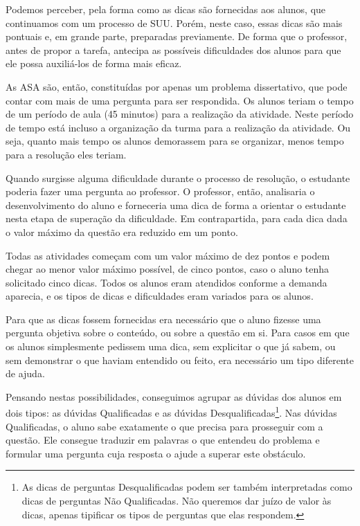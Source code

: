 Podemos perceber, pela forma como as dicas são fornecidas aos alunos, que continuamos com um processo de SUU. Porém, neste caso, essas dicas são mais pontuais e, em grande parte, preparadas previamente. De forma que o professor, antes de propor a tarefa, antecipa as possíveis dificuldades dos alunos para que ele possa auxiliá-los de forma mais eficaz.

As ASA são, então, constituídas por apenas um problema dissertativo, que pode contar com mais de uma pergunta para ser respondida. Os alunos teriam o tempo de um período de aula (45 minutos) para a realização da atividade. Neste período de tempo está incluso a organização da turma para a realização da atividade. Ou seja, quanto mais tempo os alunos demorassem para se organizar, menos tempo para a resolução eles teriam. 

Quando surgisse alguma dificuldade durante o processo de resolução, o estudante poderia fazer uma pergunta ao professor. O professor, então, analisaria o desenvolvimento do aluno e forneceria uma dica de forma a orientar o estudante nesta etapa de superação da dificuldade. Em contrapartida, para cada dica dada o valor máximo da questão era reduzido em um ponto. 

Todas as atividades começam com um valor máximo de dez pontos e podem chegar ao menor valor máximo possível, de cinco pontos, caso o aluno tenha solicitado cinco dicas. Todos os alunos eram atendidos conforme a demanda aparecia, e os tipos de dicas e dificuldades eram variados para os alunos. 

Para que as dicas fossem fornecidas era necessário que o aluno fizesse uma pergunta objetiva sobre o conteúdo, ou sobre a questão em si. Para casos em que os alunos simplesmente pedissem uma dica, sem explicitar o que já sabem, ou sem demonstrar o que haviam entendido ou feito, era necessário um tipo diferente de ajuda. 

Pensando nestas possibilidades, conseguimos agrupar as dúvidas dos alunos em dois tipos: as dúvidas Qualificadas e as dúvidas Desqualificadas\footnote{As dicas de perguntas Desqualificadas podem ser também interpretadas como dicas de perguntas Não Qualificadas. Não queremos dar juízo de valor às dicas, apenas tipificar os tipos de perguntas que elas respondem.}. Nas dúvidas Qualificadas, o aluno sabe exatamente o que precisa para prosseguir com a questão. Ele consegue traduzir em palavras o que entendeu do problema e formular uma pergunta cuja resposta o ajude a superar este obstáculo. 

